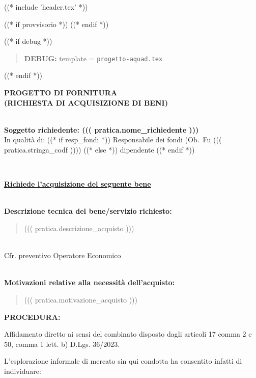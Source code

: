 
((* include 'header.tex' *))

((* if provvisorio *))
((* endif *))


\topaddr

((* if debug *))
\begin{quotation}
	\textbf{DEBUG:} template = \texttt{progetto-aquad.tex}
\end{quotation}
((* endif *))

\begin{center}
\textbf{PROGETTO DI FORNITURA \\ (RICHIESTA DI ACQUISIZIONE DI BENI)}
\end{center}

~\\
\textbf{Soggetto richiedente: ((( pratica.nome_richiedente )))} \\

In qualità di:          %
((* if resp_fondi *)) Responsabile dei fondi (Ob.~Fu ((( pratica.stringa_codf ))))
((* else *)) dipendente
((* endif *))

~\\
\begin{center}
\textbf{\underline{Richiede l'acquisizione del seguente bene}}
\end{center}

~\\
\textbf{Descrizione tecnica del bene/servizio richiesto:}
\begin{quote}
((( pratica.descrizione_acquisto )))
\end{quote}

~\\
Cfr. preventivo Operatore Economico 

~\\
\textbf{Motivazioni relative alla necessità dell’acquisto: }
\begin{quote}
((( pratica.motivazione_acquisto )))
\end{quote}


\textbf{PROCEDURA: } %

Affidamento diretto ai sensi del combinato disposto dagli articoli 17 comma 2 e 50, comma 1 lett. b) D.Lgs. 36/2023.

L’esplorazione informale di mercato sin qui condotta ha consentito infatti di individuare:

